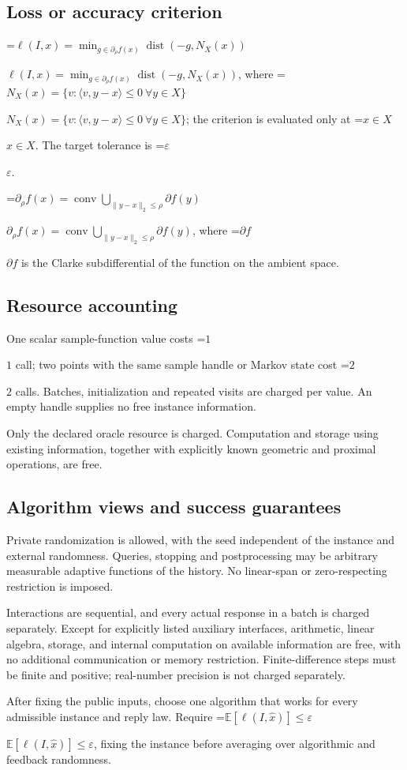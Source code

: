 \documentclass[10pt,a4paper]{article}
\newcommand{\AtlasMath}[1]{\par\begingroup\centering\setbox0=\hbox{$\displaystyle #1$}\ifdim\wd0>1.4\linewidth\typeout{ATLAS WIDE FORMULA: \the\wd0}\fi\ifdim\wd0>\linewidth\resizebox{\linewidth}{!}{\box0}\else\box0\fi\par\endgroup}
\newcommand{\AtlasInlineMath}[1]{\begingroup\setbox0=\hbox{$#1$}\ifdim\wd0>.4\linewidth\endgroup\AtlasMath{#1}\else\endgroup$#1$\fi}
\begin{document}
\subsection{Loss or accuracy criterion}
\AtlasInlineMath{\ell(I,x)=\min_{g\in\partial_\rho f(x)}\operatorname{dist}(-g,N_X(x))}, where \AtlasInlineMath{N_X(x)=\{v:\langle v,y-x\rangle\le0\ \forall y\in X\}}; the criterion is evaluated only at \AtlasInlineMath{x\in X}. The target tolerance is \AtlasInlineMath{\varepsilon}.

\AtlasInlineMath{\partial_\rho f(x)=\operatorname{conv}\bigcup_{\|y-x\|_2\le\rho}\partial f(y)}, where \AtlasInlineMath{\partial f} is the Clarke subdifferential of the function on the ambient space.

\subsection{Resource accounting}
One scalar sample-function value costs \AtlasInlineMath{1} call; two points with the same sample handle or Markov state cost \AtlasInlineMath{2} calls. Batches, initialization and repeated visits are charged per value. An empty handle supplies no free instance information.

Only the declared oracle resource is charged. Computation and storage using existing information, together with explicitly known geometric and proximal operations, are free.

\subsection{Algorithm views and success guarantees}
Private randomization is allowed, with the seed independent of the instance and external randomness. Queries, stopping and postprocessing may be arbitrary measurable adaptive functions of the history. No linear-span or zero-respecting restriction is imposed.

Interactions are sequential, and every actual response in a batch is charged separately. Except for explicitly listed auxiliary interfaces, arithmetic, linear algebra, storage, and internal computation on available information are free, with no additional communication or memory restriction. Finite-difference steps must be finite and positive; real-number precision is not charged separately.

After fixing the public inputs, choose one algorithm that works for every admissible instance and reply law. Require \AtlasInlineMath{\mathbb{E}[\ell(I,\widehat{x})]\le \varepsilon}, fixing the instance before averaging over algorithmic and feedback randomness.
\end{document}
